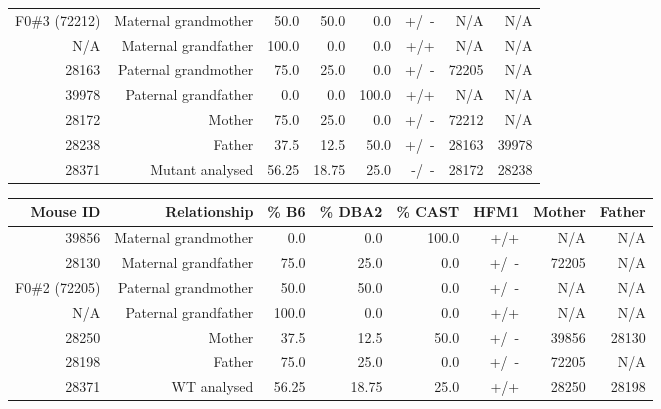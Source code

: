\begin{table}[p]
\begin{subtable}[h]{\textwidth}
\begin{adjustbox}{width = 1\textwidth}
\begin{tabular}{rrrrrrrr}
				\midrule
				F0\#3 (72212)  & Maternal grandmother  & 50.0  & 50.0  & 0.0   & +/~- & N/A    & N/A \\
				N/A      & Maternal grandfather  & 100.0 & 0.0   & 0.0   & +/+ & N/A    & N/A \\
				28163   & Paternal grandmother  & 75.0  & 25.0  & 0.0   & +/~- & 72205 & N/A \\
				39978   & Paternal grandfather  & 0.0   & 0.0   & 100.0 & +/+ & N/A    & N/A \\
				\midrule
				28172   & Mother                & 75.0  & 25.0  & 0.0   & +/~- & 72212 & N/A \\
				28238   & Father                & 37.5  & 12.5  & 50.0  & +/~- & 28163 & 39978 \\
				\midrule
				28371   & Mutant analysed       & 56.25 & 18.75 & 25.0  & -/~- & 28172 & 28238 \\
				\bottomrule

			\end{tabular}
		\end{adjustbox}
\label{tab:ancestry-28367}
	\end{subtable}
	\vspace{2cm}


	\begin{subtable}[h]{\textwidth}

		\centering
		\begin{adjustbox}{width = 1\textwidth}
			\begin{tabular}{rrrrrrrr}

				\toprule
				\textbf{Mouse ID} & \textbf{Relationship} & \textbf{\% B6} & \textbf{\% DBA2} & \textbf{\% CAST} & \textbf{HFM1} & \textbf{Mother} & \textbf{Father} \\

				\midrule
				39856   & Maternal grandmother  & 0.0   & 0.0   & 100.0 & +/+ & N/A    & N/A \\
				28130   & Maternal grandfather  & 75.0  & 25.0  & 0.0   & +/~- & 72205 & N/A \\
				F0\#2 (72205)  & Paternal grandmother  & 50.0  & 50.0  & 0.0   & +/~- & N/A    & N/A \\
				N/A      & Paternal grandfather  & 100.0 & 0.0   & 0.0   & +/+ & N/A    & N/A \\
				\midrule
				28250   & Mother                & 37.5  & 12.5  & 50.0  & +/~- & 39856 & 28130 \\
				28198   & Father                & 75.0  & 25.0  & 0.0   & +/~- & 72205 & N/A \\
				\midrule
				28371   & WT analysed           & 56.25 & 18.75 & 25.0  & +/+ & 28250 & 28198 \\
				\toprule


\end{tabular}
\end{adjustbox}
\end{subtable}
\end{table}
